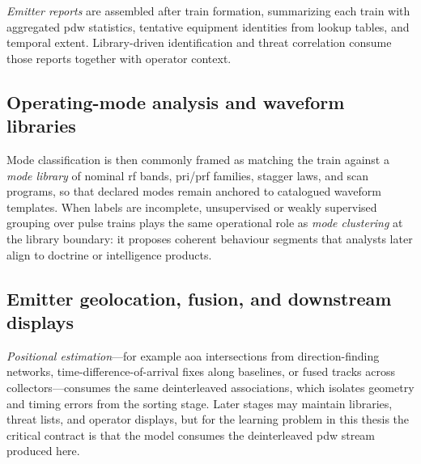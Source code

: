 \emph{Emitter reports} are assembled after train formation, summarizing each train with aggregated \gls{pdw} statistics, tentative equipment identities from lookup tables, and temporal extent.
Library-driven identification and threat correlation consume those reports together with operator context.

\subsection{Operating-mode analysis and waveform libraries}

Mode classification is then commonly framed as matching the train against a \emph{mode library} of nominal \gls{rf} bands, \gls{pri}/\gls{prf} families, stagger laws, and scan programs, so that declared modes remain anchored to catalogued waveform templates.
When labels are incomplete, unsupervised or weakly supervised grouping over pulse trains plays the same operational role as \emph{mode clustering} at the library boundary: it proposes coherent behaviour segments that analysts later align to doctrine or intelligence products.

\subsection{Emitter geolocation, fusion, and downstream displays}

\emph{Positional estimation}---for example \gls{aoa} intersections from direction-finding networks, time-difference-of-arrival fixes along baselines, or fused tracks across collectors---consumes the same deinterleaved associations, which isolates geometry and timing errors from the sorting stage.
Later stages may maintain libraries, threat lists, and operator displays, but for the learning problem in this thesis the critical contract is that the model consumes the deinterleaved \gls{pdw} stream produced here.

